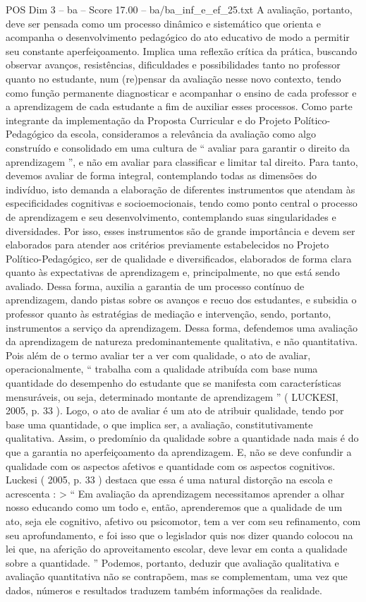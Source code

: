 \begin{textsample}{POS Dim 3 – ba – Score 17.00 – ba/ba\_inf\_e\_ef\_25.txt}
A avaliação, portanto, deve ser pensada como um processo dinâmico e sistemático que orienta e acompanha o desenvolvimento pedagógico do ato educativo de modo a permitir seu constante aperfeiçoamento.
Implica uma reflexão crítica da prática, buscando observar avanços, resistências, dificuldades e possibilidades tanto no professor quanto no estudante, num (re)pensar da avaliação nesse novo contexto, tendo como função permanente diagnosticar e acompanhar o ensino de cada professor e a aprendizagem de cada estudante a fim de auxiliar esses processos.
Como parte integrante da implementação da Proposta Curricular e do Projeto Político-Pedagógico da escola, consideramos a relevância da avaliação como algo construído e consolidado em uma cultura de “ avaliar para garantir o direito da aprendizagem ”, e não em avaliar para classificar e limitar tal direito.
Para tanto, devemos avaliar de forma integral, contemplando todas as dimensões do indivíduo, isto demanda a elaboração de diferentes instrumentos que atendam às especificidades cognitivas e socioemocionais, tendo como ponto central o processo de aprendizagem e seu desenvolvimento, contemplando suas singularidades e diversidades.
Por isso, esses instrumentos são de grande importância e devem ser elaborados para atender aos critérios previamente estabelecidos no Projeto Político-Pedagógico, ser de qualidade e diversificados, elaborados de forma clara quanto às expectativas de aprendizagem e, principalmente, no que está sendo avaliado.
Dessa forma, auxilia a garantia de um processo contínuo de aprendizagem, dando pistas sobre os avanços e recuo dos estudantes, e subsidia o professor quanto às estratégias de mediação e intervenção, sendo, portanto, instrumentos a serviço da aprendizagem.
Dessa forma, defendemos uma avaliação da aprendizagem de natureza predominantemente qualitativa, e não quantitativa.
Pois além de o termo avaliar ter a ver com qualidade, o ato de avaliar, operacionalmente, “ trabalha com a qualidade atribuída com base numa quantidade do desempenho do estudante que se manifesta com características mensuráveis, ou seja, determinado montante de aprendizagem ” ( LUCKESI, 2005, p. 33 ).
Logo, o ato de avaliar é um ato de atribuir qualidade, tendo por base uma quantidade, o que implica ser, a avaliação, constitutivamente qualitativa.
Assim, o predomínio da qualidade sobre a quantidade nada mais é do que a garantia no aperfeiçoamento da aprendizagem.
E, não se deve confundir a qualidade com os aspectos afetivos e quantidade com os aspectos cognitivos.
Luckesi ( 2005, p. 33 ) destaca que essa é uma natural distorção na escola e acrescenta : > “ Em avaliação da aprendizagem necessitamos aprender a olhar nosso educando como um todo e, então, aprenderemos que a qualidade de um ato, seja ele cognitivo, afetivo ou psicomotor, tem a ver com seu refinamento, com seu aprofundamento, e foi isso que o legislador quis nos dizer quando colocou na lei que, na aferição do aproveitamento escolar, deve levar em conta a qualidade sobre a quantidade. ” Podemos, portanto, deduzir que avaliação qualitativa e avaliação quantitativa não se contrapõem, mas se complementam, uma vez que dados, números e resultados traduzem também informações da realidade.

\end{textsample}

